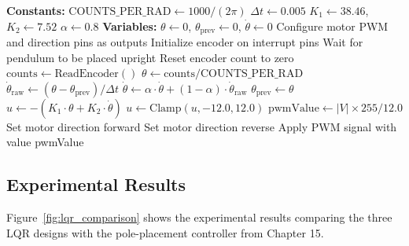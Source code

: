 \begin{algorithm}[H]
\caption{LQR Inverted Pendulum Real-Time Control}
\begin{algorithmic}[1]
\State \textbf{Constants:}
\State \quad $\text{COUNTS\_PER\_RAD} \gets 1000 / (2\pi)$
\State \quad $\Delta t \gets 0.005$ 
\State \quad $K_1 \gets 38.46$, $K_2 \gets 7.52$ 
\State \quad $\alpha \gets 0.8$ 
\State
\State \textbf{Variables:}
\State \quad $\theta \gets 0$, $\theta_{\text{prev}} \gets 0$, $\dot{\theta} \gets 0$
\State
{}
    \State Configure motor PWM and direction pins as outputs
    \State Initialize encoder on interrupt pins
    \State Wait for pendulum to be placed upright
    \State Reset encoder count to zero
\EndProcedure
\State
{}
            \State {}
            \State $\text{counts} \gets \text{ReadEncoder}()$
            \State $\theta \gets \text{counts} / \text{COUNTS\_PER\_RAD}$
            \State
            \State {}
            \State $\dot{\theta}_{\text{raw}} \gets (\theta - \theta_{\text{prev}}) / \Delta t$
            \State $\dot{\theta} \gets \alpha \cdot \dot{\theta} + (1 - \alpha) \cdot \dot{\theta}_{\text{raw}}$
            \State $\theta_{\text{prev}} \gets \theta$
            \State
            \State {}
            \State $u \gets -(K_1 \cdot \theta + K_2 \cdot \dot{\theta})$
            \State
            \State {}
            \State $u \gets \text{Clamp}(u, -12.0, 12.0)$
            \State
            \State {}
            \State {}
        \EndIf
    \EndWhile
\EndProcedure
\State
{}
    \State $\text{pwmValue} \gets |V| \times 255 / 12.0$
        \State Set motor direction forward
    \Else
        \State Set motor direction reverse
    \EndIf
    \State Apply PWM signal with value pwmValue
\EndProcedure
\end{algorithmic}
\end{algorithm}

\subsection{Experimental Results}

Figure~\ref{fig:lqr_comparison} shows the experimental results comparing the three LQR designs with the pole-placement controller from Chapter 15.

